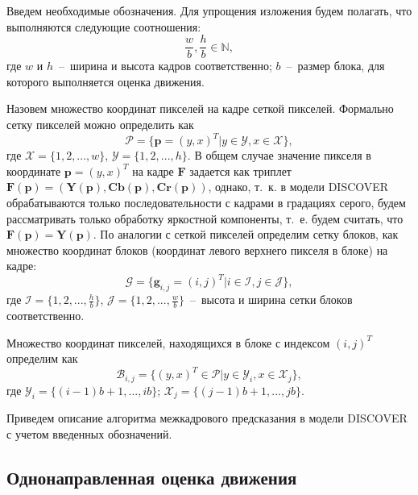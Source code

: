 Введем необходимые обозначения. Для упрощения изложения будем полагать, что выполняются следующие соотношения:
\begin{equation*}
\frac{w}{b}, \frac{h}{b} \in \mathbb{N},
\end{equation*}
где $w$ и $h$~--~ширина и высота кадров соответственно; $b$~--~размер блока, для которого выполняется оценка движения.

Назовем множество координат пикселей на кадре сеткой пикселей. Формально сетку пикселей можно определить как
\begin{equation*}
\mathcal{P} = \lbrace \mathbf{p}=(y,x)^T \vert y \in \mathcal{Y}, x \in \mathcal{X} \rbrace,
\end{equation*}
где $\mathcal{X}=\lbrace 1,2,...,w \rbrace $, $\mathcal{Y}= \lbrace 1,2,...,h \rbrace $. В общем случае значение пикселя в координате $\mathbf{p}=(y,x)^T$ на кадре $\mathbf{F}$ задается как триплет $\mathbf{F}(\mathbf{p})=(\mathbf{Y}(\mathbf{p}),\mathbf{Cb}(\mathbf{p}),\mathbf{Cr}(\mathbf{p}))$, однако, т.~к. в модели DISCOVER обрабатываются только последовательности с кадрами в градациях серого, будем рассматривать только обработку яркостной компоненты, т.~е. будем считать, что  $\mathbf{F}(\mathbf{p})=\mathbf{Y}(\mathbf{p})$.
По аналогии с сеткой пикселей определим сетку блоков, как множество координат блоков (координат левого верхнего пикселя в блоке) на кадре:
\begin{equation*}
\mathcal{G} = \lbrace \mathbf{g}_{i,j}=(i,j)^T \vert i \in \mathcal{I}, j \in \mathcal{J} \rbrace,
\end{equation*}
где $\mathcal{I}=\lbrace 1,2,...,\frac{h}{b}\rbrace$, $\mathcal{J}=\lbrace 1,2,...,\frac{w}{b}\rbrace$~--~высота и ширина сетки блоков соответственно. 

Множество координат пикселей, находящихся в блоке с индексом $(i, j)^T$ определим как
\begin{equation*}
\mathcal{B}_{i,j} = \lbrace (y,x)^T \in \mathcal{P} \vert y \in \mathcal{Y}_i, x \in \mathcal{X}_j \rbrace,
\end{equation*}
где $\mathcal{Y}_i=\lbrace (i-1)b+1,..., ib \rbrace$; $\mathcal{X}_j=\lbrace (j-1)b+1,..., j b\rbrace$.

Приведем описание алгоритма межкадрового предсказания в модели DISCOVER с учетом введенных обозначений.

\subsection{Однонаправленная оценка движения}

